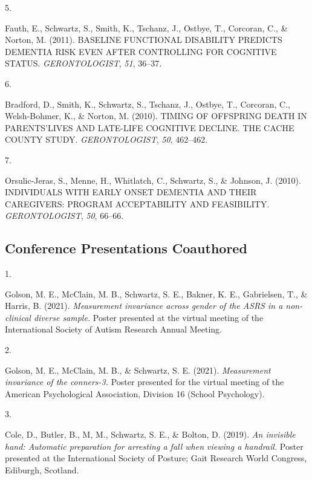 \documentclass[11pt,a4paper,]{moderncv}
\newlength{\csllabelwidth}
\newcommand{\CSLLeftMargin}[1]{\parbox[t]{\csllabelwidth}{#1}}
\newcommand{\CSLRightInline}[1]{\parbox[t]{\linewidth - \csllabelwidth}{#1}}
\begin{document}
\leavevmode\hypertarget{ref-fauth2011baseline}{}%
\CSLLeftMargin{5. }
\CSLRightInline{Fauth, E., Schwartz, S., Smith, K., Tschanz, J., Ostbye,
T., Corcoran, C., \& Norton, M. (2011). BASELINE FUNCTIONAL DISABILITY
PREDICTS DEMENTIA RISK EVEN AFTER CONTROLLING FOR COGNITIVE STATUS.
\emph{GERONTOLOGIST}, \emph{51}, 36--37.}

\leavevmode\hypertarget{ref-bradford2010timing}{}%
\CSLLeftMargin{6. }
\CSLRightInline{Bradford, D., Smith, K., Schwartz, S., Tschanz, J.,
Ostbye, T., Corcoran, C., Welsh-Bohmer, K., \& Norton, M. (2010). TIMING
OF OFFSPRING DEATH IN PARENTS'LIVES AND LATE-LIFE COGNITIVE DECLINE. THE
CACHE COUNTY STUDY. \emph{GERONTOLOGIST}, \emph{50}, 462--462.}

\leavevmode\hypertarget{ref-orsulic2010individuals}{}%
\CSLLeftMargin{7. }
\CSLRightInline{Orsulic-Jeras, S., Menne, H., Whitlatch, C., Schwartz,
S., \& Johnson, J. (2010). INDIVIDUALS WITH EARLY ONSET DEMENTIA AND
THEIR CAREGIVERS: PROGRAM ACCEPTABILITY AND FEASIBILITY.
\emph{GERONTOLOGIST}, \emph{50}, 66--66.}

\vspace{7mm}

\hypertarget{conference-presentations-coauthored}{%
\subsection{\texorpdfstring{\textbf{Conference Presentations
Coauthored}}{Conference Presentations Coauthored}}\label{conference-presentations-coauthored}}

\hypertarget{refs_confco}{}
\leavevmode\hypertarget{ref-golson2021isa}{}%
\CSLLeftMargin{1. }
\CSLRightInline{Golson, M. E., McClain, M. B., Schwartz, S. E., Bakner,
K. E., Gabrielsen, T., \& Harris, B. (2021). \emph{Measurement
invariance across gender of the ASRS in a non-clinical diverse sample.}
Poster presented at the virtual meeting of the International Society of
Autism Research Annual Meeting.}

\leavevmode\hypertarget{ref-golson2021apa}{}%
\CSLLeftMargin{2. }
\CSLRightInline{Golson, M. E., McClain, M. B., \& Schwartz, S. E.
(2021). \emph{Measurement invariance of the conners-3.} Poster presented
for the virtual meeting of the American Psychological Association,
Division 16 (School Psychology).}

\leavevmode\hypertarget{ref-cole2019poster}{}%
\CSLLeftMargin{3. }
\CSLRightInline{Cole, D., Butler, B., M, M., Schwartz, S. E., \& Bolton,
D. (2019). \emph{An invisible hand: Automatic preparation for arresting
a fall when viewing a handrail.} Poster presented at the International
Society of Posture; Gait Research World Congress, Ediburgh, Scotland.}
\end{document}
